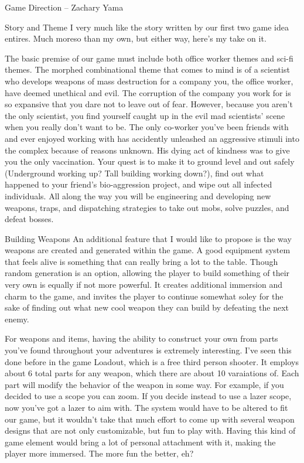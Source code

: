 \documentclass[12pt]{report}
\begin{document}
\begin{section}{Game Direction – Zachary Yama}
\begin{subsection}{Story and Theme}
I very much like the story written by our first two game idea entires. Much
moreso than my own, but either way, here's my take on it.

The basic premise of our game must include both office worker themes and
sci-fi themes. The morphed combinational theme that comes to mind is of a
scientist who develops weapons of mass destruction for a company you, the
office worker, have deemed unethical and evil. The corruption of the company
you work for is so expansive that you dare not to leave out of fear.
However, because you aren’t the only scientist, you find yourself caught up
in the evil mad scientists’ scene when you really don’t want to be. The only
co-worker you’ve been friends with and ever enjoyed working with has
accidently unleashed an aggressive stimuli into the complex because of
reasons unknown. His dying act of kindness was to give you the only
vaccination. Your quest is to make it to ground level and out safely
(Underground working up? Tall building working down?), find out what
happened to your friend’s bio-aggression project, and wipe out all infected
individuals. All along the way you will be engineering and developing new
weapons, traps, and dispatching strategies to take out mobs, solve puzzles,
and defeat bosses.
\end{subsection}

\begin{subsection}{Building Weapons}
An additional feature that I would like to propose is the way weapons are
created and generated within the game. A good equipment system that feels
alive is something that can really bring a lot to the table. Though random
generation is an option, allowing the player to build something of their
very own is equally if not more powerful. It creates additional immersion
and charm to the game, and invites the player to continue somewhat soley for
the sake of finding out what new cool weapon they can build by defeating
the next enemy.

For weapons and items, having the ability to construct your own from parts
you've found throughout your adventures is extremely interesting. I've
seen this done before in the game Loadout, which is a free third person
shooter. It employs about 6 total parts for any weapon, which there are
about 10 varaiations of. Each part will modify the behavior of the weapon in
some way. For example, if you decided to use a scope you can zoom. If you
decide instead to use a lazer scope, now you've got a lazer to aim with. The
system would have to be altered to fit our game, but it wouldn't take that
much effort to come up with several weapon designs that are not only
customizable, but fun to play with. Having this kind of game element would
bring a lot of personal attachment with it, making the player more immersed.
The more fun the better, eh?
\end{subsection}
\end{section}
\end{document}
